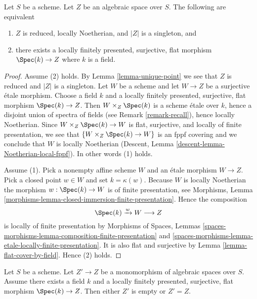 \begin{lemma}
\label{lemma-unique-point-better}
Let $S$ be a scheme. Let $Z$ be an algebraic space over $S$.
The following are equivalent
\begin{enumerate}
\item $Z$ is reduced, locally Noetherian, and $|Z|$
is a singleton, and
\item there exists a locally finitely presented, surjective, flat morphism
$\Spec(k) \to Z$ where $k$ is a field.
\end{enumerate}
\end{lemma}

\begin{proof}
Assume (2) holds. By
Lemma \ref{lemma-unique-point}
we see that $Z$ is reduced and $|Z|$ is a singleton.
Let $W$ be a scheme and let $W \to Z$ be a surjective \'etale
morphism. Choose a field $k$ and a locally finitely presented, surjective,
flat morphism $\Spec(k) \to Z$.
Then $W \times_Z \Spec(k)$ is a scheme
\'etale over $k$, hence a disjoint union of spectra of fields
(see Remark \ref{remark-recall}),
hence locally Noetherian. Since $W \times_Z \Spec(k) \to W$
is flat, surjective, and locally of finite presentation, we see
that $\{W \times_Z \Spec(k) \to W\}$ is an fppf covering
and we conclude that $W$ is locally Noetherian
(Descent, Lemma
\ref{descent-lemma-Noetherian-local-fppf}).
In other words (1) holds.

\medskip\noindent
Assume (1). Pick a nonempty affine scheme $W$ and an \'etale morphism
$W \to Z$. Pick a closed point $w \in W$ and set
$k = \kappa(w)$. Because $W$ is locally Noetherian the morphism
$w : \Spec(k) \to W$ is of finite presentation, see
Morphisms, Lemma \ref{morphisms-lemma-closed-immersion-finite-presentation}.
Hence the composition
$$
\Spec(k) \xrightarrow{w} W \longrightarrow Z
$$
is locally of finite presentation by
Morphisms of Spaces, Lemmas
\ref{spaces-morphisms-lemma-composition-finite-presentation} and
\ref{spaces-morphisms-lemma-etale-locally-finite-presentation}.
It is also flat and surjective by
Lemma \ref{lemma-flat-cover-by-field}.
Hence (2) holds.
\end{proof}

\begin{lemma}
\label{lemma-monomorphism-into-point}
Let $S$ be a scheme.
Let $Z' \to Z$ be a monomorphism of algebraic spaces over $S$.
Assume there exists a field $k$ and a locally finitely presented, surjective,
flat morphism $\Spec(k) \to Z$. Then either $Z'$
is empty or $Z' = Z$.
\end{lemma}

